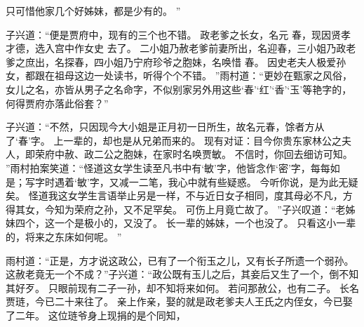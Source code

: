 只可惜他家几个好姊妹，都是少有的。
”\par
子兴道：“便是贾府中，现有的三个也不错。
政老爹之长女，名元
春，现因贤孝才德，选入宫中作女史
去了。
二小姐乃赦老爹前妻所出，名迎春，三小姐乃政老爹之庶出，名探春，四小姐乃宁府珍爷之胞妹，名唤惜
春。
因史老夫人极爱孙女，都跟在祖母这边一处读书，听得个个不错。
”雨村道：“更妙在甄家之风俗，女儿之名，亦皆从男子之名命字，不似别家另外用这些‘春’‘红’‘香’‘玉’等艳字的，何得贾府亦落此俗套？”\par
子兴道：“不然，只因现今大小姐是正月初一日所生，故名元春，馀者方从了‘春’字。
上一辈的，却也是从兄弟而来的。
现有对证：目今你贵东家林公之夫人，即荣府中赦、政二公之胞妹，在家时名唤贾敏。
不信时，你回去细访可知。
”雨村拍案笑道：“怪道这女学生读至凡书中有‘敏’字，他皆念作‘密’字，每每如是；写字时遇着‘敏’字，又减一二笔，我心中就有些疑惑。
今听你说，是为此无疑矣。
怪道我这女学生言语举止另是一样，不与近日女子相同，度其母必不凡，方得其女，今知为荣府之孙，又不足罕矣。
可伤上月竟亡故了。
”子兴叹道：“老姊妹四个，这一个是极小的，又没了。
长一辈的姊妹，一个也没了。
只看这小一辈的，将来之东床如何呢。
”\par
雨村道：“正是，方才说这政公，已有了一个衔玉之儿，又有长子所遗一个弱孙。
这赦老竟无一个不成？”子兴道：“政公既有玉儿之后，其妾后又生了一个，倒不知其好歹。
只眼前现有二子一孙，却不知将来如何。
若问那赦公，也有二子。
长名贾琏，今已二十来往了。
亲上作亲，娶的就是政老爹夫人王氏之内侄女，今已娶了二年。
这位琏爷身上现捐的是个同知，

